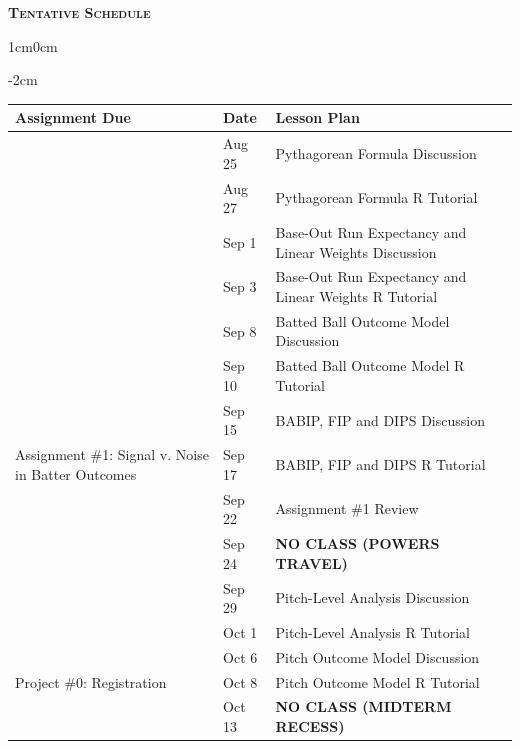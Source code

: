 \documentclass[11pt]{article}
\begin{document}
\newpage
\textbf{\textsc{Tentative Schedule}}
\begin{adjustwidth}{1cm}{0cm}
  \begin{adjustwidth}{-2cm}{}
    \begin{tabular}{llll}
      Assignment Due                                      & Date    & Lesson Plan\\
      \hline
      \hline
                                                          & Aug 25  & Pythagorean Formula Discussion\\
                                                          & Aug 27  & Pythagorean Formula R Tutorial\\
      \hline
                                                          & Sep 1   & Base-Out Run Expectancy and Linear Weights Discussion\\
                                                          & Sep 3   & Base-Out Run Expectancy and Linear Weights R Tutorial\\
      \hline
                                                          & Sep 8   & Batted Ball Outcome Model Discussion\\
                                                          & Sep 10  & Batted Ball Outcome Model R Tutorial\\
      \hline
                                                          & Sep 15  & BABIP, FIP and DIPS Discussion\\
      Assignment \#1: Signal v. Noise in Batter Outcomes  & Sep 17  & BABIP, FIP and DIPS R Tutorial\\
      \hline
                                                & Sep 22  & Assignment \#1 Review\\
                                                & Sep 24  & {\bf NO CLASS (POWERS TRAVEL)}\\
      \hline
                                                & Sep 29  & Pitch-Level Analysis Discussion\\
                                                & Oct 1   & Pitch-Level Analysis R Tutorial\\
      \hline
                                                & Oct 6   & Pitch Outcome Model Discussion\\
      Project \#0: Registration                 & Oct 8   & Pitch Outcome Model R Tutorial\\
      \hline
                                                & Oct 13  & {\bf NO CLASS (MIDTERM RECESS)}\\

\end{tabular}
\end{adjustwidth}
\end{adjustwidth}
\end{document}
